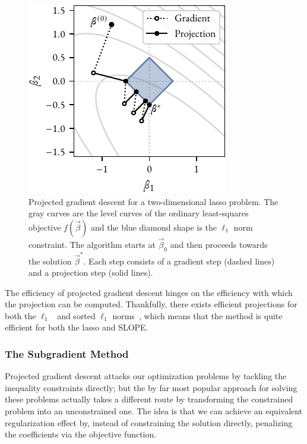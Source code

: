 \begin{figure}[htpb]
  \centering
  \includegraphics[]{figures/proj-gradient-2d.pdf}
  \caption{%
    Projected gradient descent for a two-dimensional lasso problem. The gray curves are the level curves of the ordinary least-squares objective \(f(\vec{\beta})\) and the blue diamond shape is the \(\ell_1\) norm constraint. The algorithm starts at \(\vec{\beta}_0\) and then proceeds towards the solution \(\vec{\beta}^*\). Each step consists of a gradient step (dashed lines) and a projection step (solid lines).
  }
  \label{fig:projected-gradient-descent}
\end{figure}

The efficiency of projected gradient descent hinges on the efficiency with which the projection can be computed. Thankfully, there exists efficient projections for both the \(\ell_1\)~\parencite{duchi2008} and sorted \(\ell_1\) norms~\parencite{zeng2015,li2021,perez2022,davis2015}, which means that the method is quite efficient for both the lasso and SLOPE.

\subsubsection{The Subgradient Method}

Projected gradient descent attacks our optimization problems by tackling the inequality constraints directly; but the by far most popular approach for solving these problems actually takes a different route by transforming the constrained problem into an unconstrained one. The idea is that we can achieve an equivalent regularization effect by, instead of constraining the solution directly, penalizing the coefficients via the objective function.

